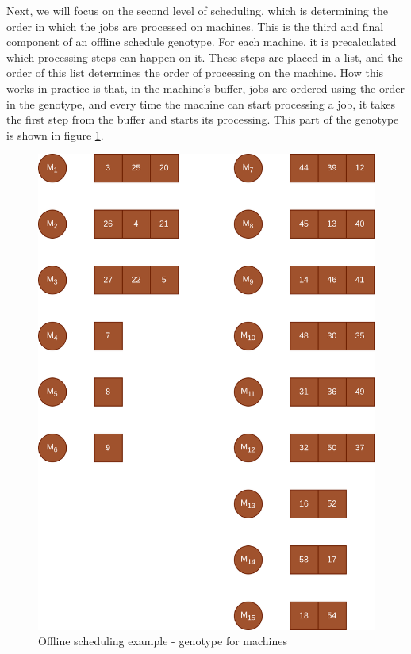 Next, we will focus on the second level of scheduling, which is determining the order in which the jobs are processed on machines. This is the third and final component of an offline schedule genotype. For each machine, it is precalculated which processing steps can happen on it. These steps are placed in a list, and the order of this list determines the order of processing on the machine. How this works in practice is that, in the machine's buffer, jobs are ordered using the order in the genotype, and every time the machine can start processing a job, it takes the first step from the buffer and starts its processing. This part of the genotype is shown in figure \ref{fig:offline_scheduling_genotype_machine}.

\begin{figure}[!htbp]
	\centering
	\includegraphics[scale=0.3]{../images/offline_scheduling_genotype_machine.png}
	\caption{Offline scheduling example - genotype for machines}
    \label{fig:offline_scheduling_genotype_machine}
\end{figure}

